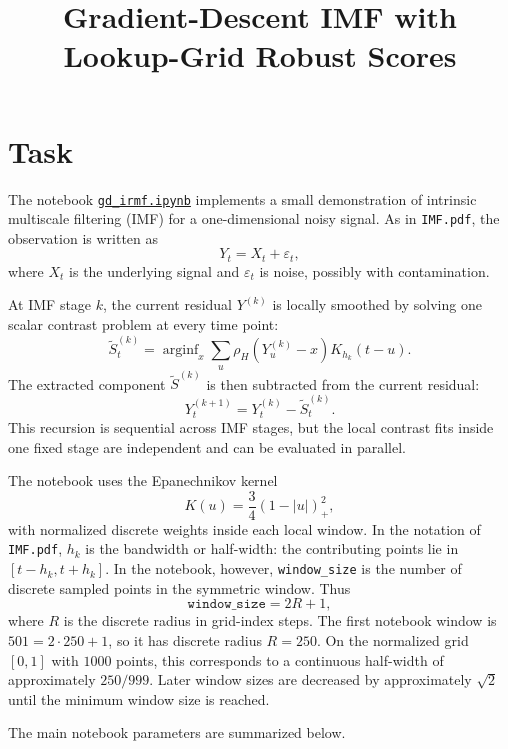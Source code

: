 \documentclass[11pt]{article}
\title{Gradient-Descent IMF with Lookup-Grid Robust Scores}
\author{}
\date{}
\begin{document}
\maketitle

\section{Task}

The notebook \href{https://github.com/mkuziuk/imf/blob/main/experiments/gd-irmf/gd_irmf.ipynb}{\texttt{gd\_irmf.ipynb}}
implements a small demonstration of intrinsic multiscale filtering (IMF) for a
one-dimensional noisy signal. As in \texttt{IMF.pdf}, the observation is written as
\[
Y_t = X_t + \varepsilon_t,
\]
where \(X_t\) is the underlying signal and \(\varepsilon_t\) is noise, possibly with
contamination.

At IMF stage \(k\), the current residual \(Y^{(k)}\) is locally smoothed by solving
one scalar contrast problem at every time point:
\[
\widetilde S_t^{(k)}
= \operatorname{arginf}_x
\sum_u \rho_H\left(Y_u^{(k)} - x\right)K_{h_k}(t-u).
\]
The extracted component \(\widetilde S^{(k)}\) is then subtracted from the current
residual:
\[
Y_t^{(k+1)} = Y_t^{(k)} - \widetilde S_t^{(k)}.
\]
This recursion is sequential across IMF stages, but the local contrast fits inside one
fixed stage are independent and can be evaluated in parallel.

The notebook uses the Epanechnikov kernel
\[
K(u) = \frac{3}{4}(1 - |u|)^2_+,
\]
with normalized discrete weights inside each local window. In the notation of
\texttt{IMF.pdf}, \(h_k\) is the bandwidth or half-width: the contributing points
lie in \([t-h_k,t+h_k]\). In the notebook, however, \texttt{window\_size} is the
number of discrete sampled points in the symmetric window. Thus
\[
\texttt{window\_size}=2R+1,
\]
where \(R\) is the discrete radius in grid-index steps. The first notebook window is
\(501=2\cdot 250+1\), so it has discrete radius \(R=250\). On the normalized grid
\([0,1]\) with \(1000\) points, this corresponds to a continuous half-width of
approximately \(250/999\). Later window sizes are decreased by approximately
\(\sqrt{2}\) until the minimum window size is reached.

The main notebook parameters are summarized below.
\end{document}
